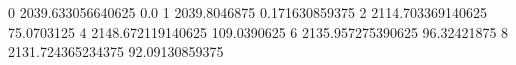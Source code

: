 0 2039.633056640625 0.0
1 2039.8046875 0.171630859375
2 2114.703369140625 75.0703125
4 2148.672119140625 109.0390625
6 2135.957275390625 96.32421875
8 2131.724365234375 92.09130859375
